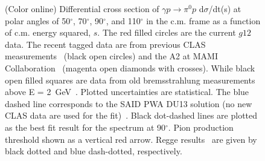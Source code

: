 \documentclass[aps,prc,twocolumn,floatfix,showpacs,preprintnumbers,amsmath,amssymb,superscriptaddress]{revtex4-1}
\begin{document}
\begin{figure}[htb!]
        \caption {(Color online) Differential cross section of 
		$\gamma p\to\pi^0p$ d$\sigma$/dt(s) at polar angles of
		50$^\circ$, 70$^\circ$, 90$^\circ$, and 
		110$^\circ$ in the c.m. frame as a function of c.m. 
		energy squared, $s$. The red filled circles are 
	    the current $g12$ data. The recent tagged data 
		are from previous CLAS measurements~\protect\cite{du07} (black 
		open circles) and the A2 at MAMI 
		Collaboration~\protect\cite{mami} (magenta open 
		diamonds with crosses). While black open filled 
		squares are data from old bremsstrahlung
		measurements above E = 2~GeV~\protect\cite{brem}. 
		Plotted uncertainties are statistical.  
		The blue dashed line corresponds to the SAID PWA 
		DU13 solution (no new CLAS data are used for the 
		fit)~\protect\cite{du13}.  Black dot-dashed lines 
		are plotted as the best fit result for the spectrum at
		90$^\circ$. Pion production threshold shown 
		as a vertical red arrow. Regge 
		results~\protect\cite{Goldstein,Laget} are given 
		by black dotted and blue dash-dotted, 
		respectively.} \label{fig:scaling}
\end{figure}
\end{document}
